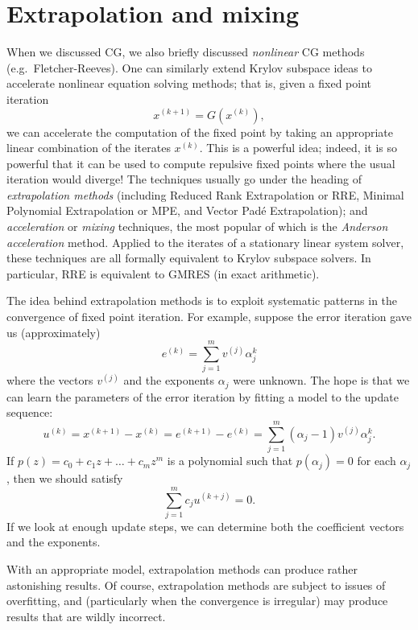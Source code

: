 \section{Extrapolation and mixing}

When we discussed CG, we also briefly discussed {\em nonlinear} CG
methods (e.g.~Fletcher-Reeves).  One can similarly extend Krylov
subspace ideas to accelerate nonlinear equation solving methods;
that is, given a fixed point iteration
\[
  x^{(k+1)} = G(x^{(k)}),
\]
we can accelerate the computation of the fixed point by taking an
appropriate linear combination of the iterates $x^{(k)}$.  This is
a powerful idea; indeed, it is so powerful that it can be used to
compute repulsive fixed points where the usual iteration would
diverge!  The techniques usually go under the heading of
{\em extrapolation methods} (including Reduced Rank Extrapolation or RRE,
Minimal Polynomial Extrapolation or MPE, and Vector Pad\'e Extrapolation);
and {\em acceleration} or {\em mixing} techniques, the most popular of
which is the {\em Anderson acceleration} method.  Applied to the iterates
of a stationary linear system solver, these techniques are all formally
equivalent to Krylov subspace solvers.  In particular, RRE is equivalent
to GMRES (in exact arithmetic).

The idea behind extrapolation methods is to exploit systematic patterns
in the convergence of fixed point iteration.  For example, suppose the
error iteration gave us (approximately)
\[
  e^{(k)} = \sum_{j=1}^m v^{(j)} \alpha_j^k
\]
where the vectors $v^{(j)}$ and the exponents $\alpha_j$ were unknown.
The hope is that we can learn the parameters of the error iteration
by fitting a model to the update sequence:
\[
  u^{(k)} = x^{(k+1)}-x^{(k)} = e^{(k+1)}-e^{(k)} =
  \sum_{j=1}^m (\alpha_j-1) v^{(j)} \alpha_j^k.
\]
If $p(z) = c_0 + c_1 z + \ldots + c_m z^m$ is a polynomial such
that $p(\alpha_j) = 0$ for each $\alpha_j$, then we should satisfy
\[
  \sum_{j=1}^m c_j u^{(k+j)} = 0.
\]
If we look at enough update steps, we can determine both the
coefficient vectors and the exponents.

With an appropriate model, extrapolation methods can produce rather
astonishing results.  Of course, extrapolation methods are subject
to issues of overfitting, and (particularly when the convergence is
irregular) may produce results that are wildly incorrect.
